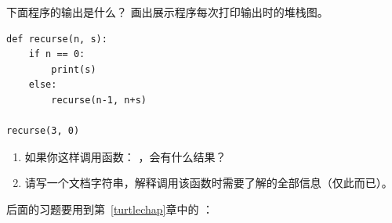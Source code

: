 {{{{\begin{exercise}
\begin{enumerate}
\end{enumerate}

\end{exercise}

\begin{exercise}

下面程序的输出是什么？ 画出展示程序每次打印输出时的堆栈图。

\begin{em}
\begin{lstlisting}
def recurse(n, s):
    if n == 0:
        print(s)
    else:
        recurse(n-1, n+s)

recurse(3, 0)
\end{lstlisting}
\end{em}





\begin{enumerate}

\item 如果你这样调用函数： {\em {}} ，会有什么结果？

\item 请写一个文档字符串，解释调用该函数时需要了解的全部信息（仅此而已）。

\end{enumerate}

\end{exercise}


后面的习题要用到第~\ref{turtlechap}章中的 ：

\begin{exercise}



\end{exercise}}}}}
